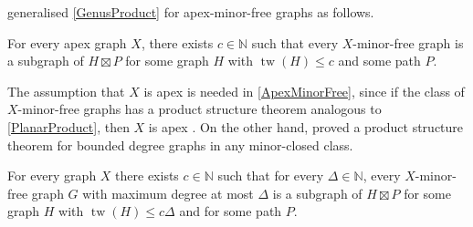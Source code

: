 \documentclass{patmorin}
\newcommand{\note}[2]{\noindent{\color{red}[#1:~#2]}}
\DeclareMathOperator{\tw}{tw}
\newcommand{\PP}{\mathcal{P}}
\renewcommand{\geq}{\geqslant}
\renewcommand{\leq}{\leqslant}
\begin{document}
\citet{DJMMUW20} generalised \cref{GenusProduct} for apex-minor-free graphs as follows.

\begin{thm}
	\label{ApexMinorFree}
	For every apex graph $X$, there exists $c\in\mathbb{N}$ such that every $X$-minor-free graph is a subgraph of $H\boxtimes P$ for some graph $H$ with $\tw(H)\leq c$ and some path $P$.
\end{thm}

The assumption that $X$ is apex is needed in \cref{ApexMinorFree}, since if the class of $X$-minor-free graphs has a product structure theorem analogous to \cref{PlanarProduct}, then $X$ is apex \citep{DJMMUW20}. On the other hand, \citet{DEMWW22} proved a product structure theorem for bounded degree graphs in any minor-closed class.

\begin{thm}
	\label{MinorFreeDegree}
	For every graph $X$ there exists $c\in\mathbb{N}$ such that for every $\Delta\in\mathbb{N}$, every $X$-minor-free graph $G$ with maximum degree at most $\Delta$ is a subgraph of $H\boxtimes P$ for some graph $H$ with $\tw(H) \leq c\Delta$ and for some path $P$.
\end{thm}

%
%
%
%
\end{document}
